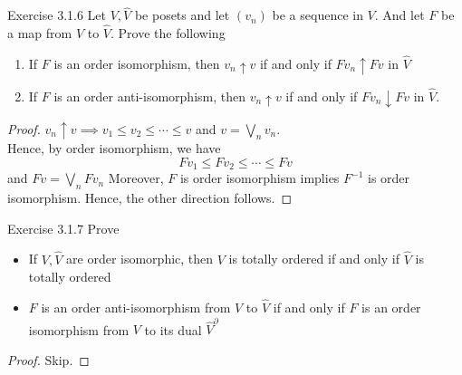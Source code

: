 \begin{frame}{Exercise 3.1.6}
Let $V,\hat V$ be posets and let $(v_n)$ be a sequence in $V$. And let $F$ be a map from $V$ to $\hat V$. Prove the following
\begin{enumerate}
    \item If $F$ is an order isomorphism, then $v_n\uparrow v$ if and only if $Fv_n \uparrow Fv$ in $\hat V$
    \item If $F$ is an order anti-isomorphism, then $v_n\uparrow v$ if and only if $Fv_n\downarrow Fv$ in $\hat V$.
\end{enumerate}
\begin{proof}
    $v_n\uparrow v\implies v_1\le v_2\le \cdots\le v$ and $v= \bigvee_n v_n$.\\
    Hence, by order isomorphism, we have
    $$
    Fv_1\le Fv_2\le \cdots \le Fv
    $$
    and $Fv = \bigvee_n Fv_n$
    Moreover, $F$ is order isomorphism implies $F^{-1}$ is order isomorphism. Hence, the other direction follows. 
\end{proof}
\end{frame}

\begin{frame}{Exercise 3.1.7}
Prove 
\begin{itemize}
    \item If $V,\hat V$ are order isomorphic, then $V$ is totally ordered if and only if $\hat V$ is totally ordered
    \item $F$ is an order anti-isomorphism from $V$ to $\hat V$ if and only if $F$ is an order isomorphism from $V$ to its dual $\hat V^\partial$
\end{itemize}
\begin{proof}
Skip.
\end{proof}
\end{frame}